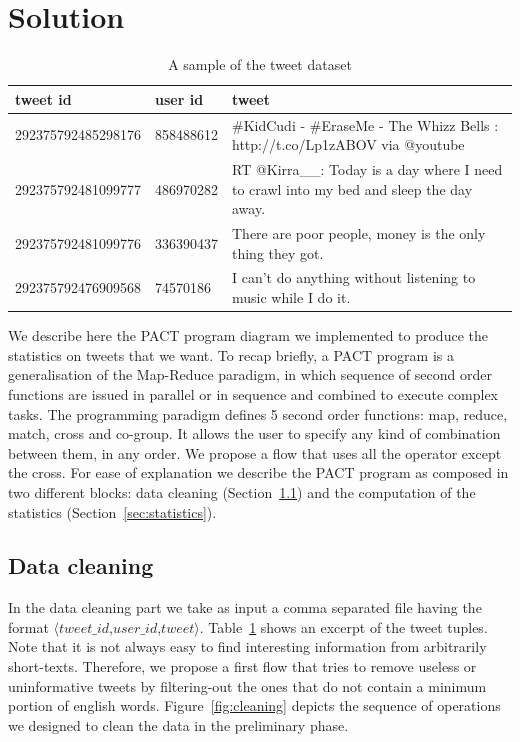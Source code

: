 \section{Solution}
\label{sec:solution}

\begin{table}[!t]
\begin{tabular}{|l|l|l|}
\hline
tweet id & user id & tweet\\
\hline
292375792485298176&858488612& \#KidCudi - \#EraseMe - The Whizz Bells : http://t.co/Lp1zABOV via @youtube\\
292375792481099777&486970282& RT @Kirra\_\_: Today is a day where I need to crawl into my bed and sleep the day away.\\
292375792481099776&336390437& There are poor people, money is the only thing they got.\\
292375792476909568&74570186& I can't do anything without listening to music while I do it.\\
\hline
\end{tabular}
\caption{A sample of the tweet dataset}
\label{tbl:tweets}
\end{table}


We describe here the PACT program diagram we implemented to produce the statistics on tweets that we want. 
To recap briefly, a PACT program is a generalisation of the Map-Reduce paradigm, in which sequence of second order functions are issued in parallel or in sequence and combined to execute complex tasks. 
The programming paradigm defines 5 second order functions: map, reduce, match, cross and co-group.
It allows the user to specify any kind of combination between them, in any order.
We propose a flow that uses all the operator except the cross. 
For ease of explanation we describe the PACT program as composed in two different blocks: data cleaning (Section~\ref{sec:cleaning}) and the computation of the statistics (Section~\ref{sec:statistics}).

\subsection{Data cleaning}
\label{sec:cleaning}
In the data cleaning part we take as input a comma separated file having the format $\langle tweet\_id$,$user\_id$,$tweet \rangle$. 
Table~\ref{tbl:tweets} shows an excerpt of the tweet tuples. 
Note that it is not always easy to find interesting information from arbitrarily short-texts.
Therefore, we propose a first flow that tries to remove useless or uninformative tweets by filtering-out the ones that do not contain a minimum portion of english words. 
Figure~\ref{fig:cleaning} depicts the sequence of operations we designed to clean the data in the preliminary phase. 

